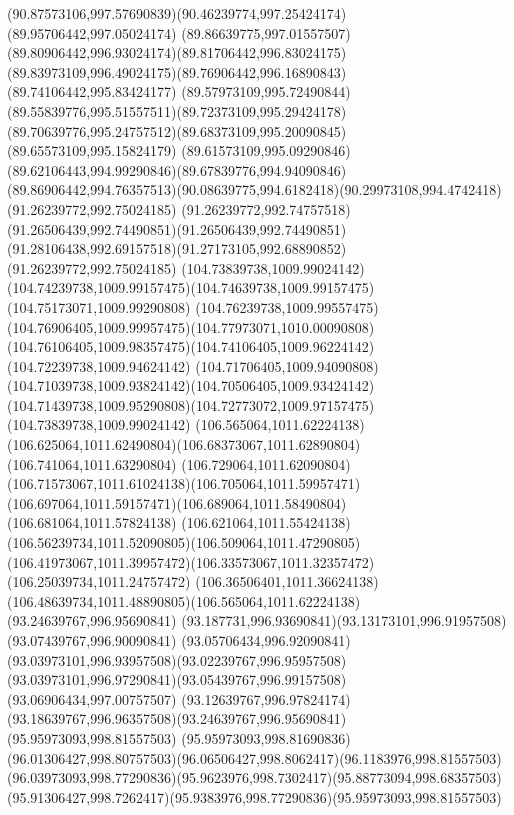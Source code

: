 {{  \curveto(90.87573106,997.57690839)(90.46239774,997.25424174)(89.95706442,997.05024174)
  \curveto(89.86639775,997.01557507)(89.80906442,996.93024174)(89.81706442,996.83024175)
  \curveto(89.83973109,996.49024175)(89.76906442,996.16890843)(89.74106442,995.83424177)
  \curveto(89.57973109,995.72490844)(89.55839776,995.51557511)(89.72373109,995.29424178)
  \curveto(89.70639776,995.24757512)(89.68373109,995.20090845)(89.65573109,995.15824179)
  \curveto(89.61573109,995.09290846)(89.62106443,994.99290846)(89.67839776,994.94090846)
  \curveto(89.86906442,994.76357513)(90.08639775,994.6182418)(90.29973108,994.4742418)
  \moveto(91.26239772,992.75024185)
  \curveto(91.26239772,992.74757518)(91.26506439,992.74490851)(91.26506439,992.74490851)
  \curveto(91.28106438,992.69157518)(91.27173105,992.68890852)(91.26239772,992.75024185)
  \moveto(104.73839738,1009.99024142)
  \curveto(104.74239738,1009.99157475)(104.74639738,1009.99157475)(104.75173071,1009.99290808)
  \curveto(104.76239738,1009.99557475)(104.76906405,1009.99957475)(104.77973071,1010.00090808)
  \curveto(104.76106405,1009.98357475)(104.74106405,1009.96224142)(104.72239738,1009.94624142)
  \curveto(104.71706405,1009.94090808)(104.71039738,1009.93824142)(104.70506405,1009.93424142)
  \curveto(104.71439738,1009.95290808)(104.72773072,1009.97157475)(104.73839738,1009.99024142)
  \moveto(106.565064,1011.62224138)
  \curveto(106.625064,1011.62490804)(106.68373067,1011.62890804)(106.741064,1011.63290804)
  \curveto(106.729064,1011.62090804)(106.71573067,1011.61024138)(106.705064,1011.59957471)
  \curveto(106.697064,1011.59157471)(106.689064,1011.58490804)(106.681064,1011.57824138)
  \curveto(106.621064,1011.55424138)(106.56239734,1011.52090805)(106.509064,1011.47290805)
  \curveto(106.41973067,1011.39957472)(106.33573067,1011.32357472)(106.25039734,1011.24757472)
  \curveto(106.36506401,1011.36624138)(106.48639734,1011.48890805)(106.565064,1011.62224138)
  \moveto(93.24639767,996.95690841)
  \curveto(93.187731,996.93690841)(93.13173101,996.91957508)(93.07439767,996.90090841)
  \curveto(93.05706434,996.92090841)(93.03973101,996.93957508)(93.02239767,996.95957508)
  \curveto(93.03973101,996.97290841)(93.05439767,996.99157508)(93.06906434,997.00757507)
  \curveto(93.12639767,996.97824174)(93.18639767,996.96357508)(93.24639767,996.95690841)
  \moveto(95.95973093,998.81557503)
  \lineto(95.95973093,998.81690836)
  \curveto(96.01306427,998.80757503)(96.06506427,998.8062417)(96.1183976,998.81557503)
  \curveto(96.03973093,998.77290836)(95.9623976,998.7302417)(95.88773094,998.68357503)
  \curveto(95.91306427,998.7262417)(95.9383976,998.77290836)(95.95973093,998.81557503)
}}
